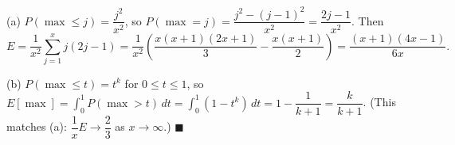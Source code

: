 (a) $P(\max\le j)=\dfrac{j^2}{x^2}$, so $P(\max=j)=\dfrac{j^2-(j-1)^2}{x^2}=\dfrac{2j-1}{x^2}$. Then
\[E=\dfrac1{x^2}\sum_{j=1}^x j(2j-1)=\dfrac1{x^2}\left(\dfrac{x(x+1)(2x+1)}3-\dfrac{x(x+1)}2\right)=\dfrac{(x+1)(4x-1)}{6x}.\]

(b) $P(\max\le t)=t^k$ for $0\le t\le1$, so $E[\max]=\displaystyle\int_0^1P(\max>t)\,dt=\int_0^1(1-t^k)\,dt=1-\dfrac1{k+1}=\boxed{\dfrac k{k+1}}$. (This matches (a): $\dfrac1x E\to\dfrac23$ as $x\to\infty$.) $\blacksquare$
